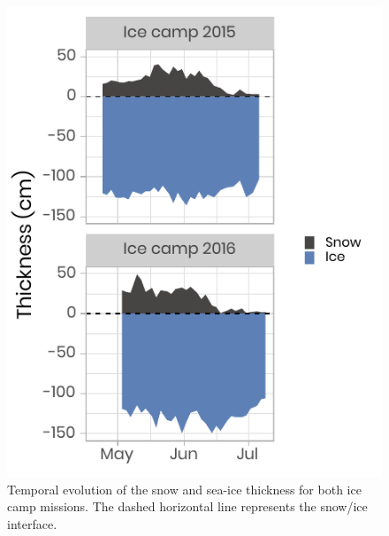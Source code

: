 \documentclass[12pt,a4paper]{scrartcl}
\begin{document}
\begin{figure}[h]
	\centering
	\includegraphics[scale = 2]{../../../graphs/fig2.pdf}
	\caption{Temporal evolution of the snow and sea-ice thickness for both ice camp missions. The dashed horizontal line represents the snow/ice interface.}
\end{figure}

\clearpage
\newpage
\end{document}
